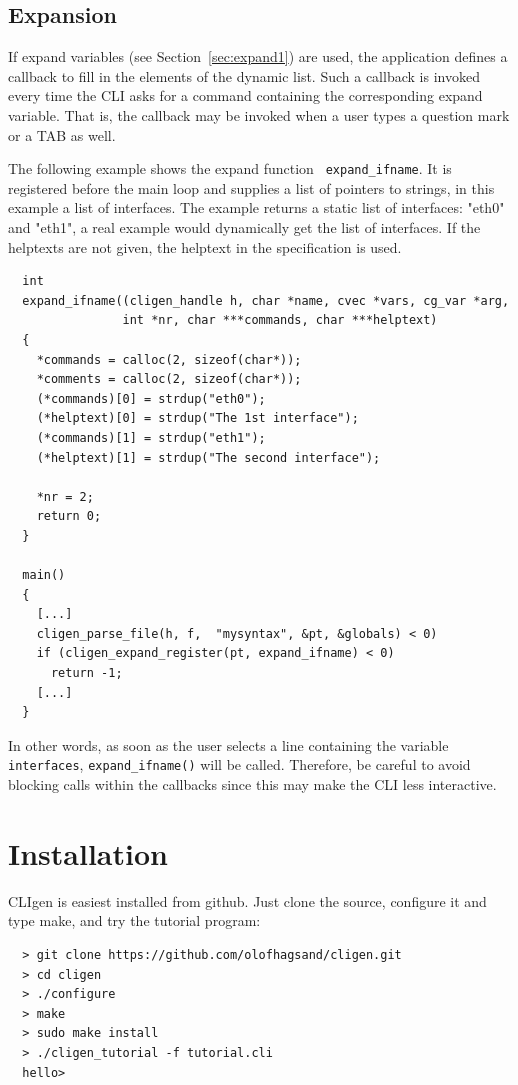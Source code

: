 \documentclass[a4paper, 10pt] {article}
\begin{document}
\subsection{Expansion}
\label{sec:expand}

If expand variables (see Section~\ref{sec:expand1}) are used, the
application defines a callback to fill in the elements of the dynamic
list. Such a callback is invoked every time the CLI asks for a command
containing the corresponding expand variable. That is, the callback
may be invoked when a user types a question mark or a TAB as well.

The following example shows the expand function {\tt
  expand\_ifname}. It is registered before the main loop and supplies
a list of pointers to strings, in this example a list of
interfaces. The example returns a static list of interfaces: "eth0"
and "eth1", a real example would dynamically get the list of
interfaces. If the helptexts are not given, the helptext in the specification is used.


\begin{verbatim}
  int 
  expand_ifname((cligen_handle h, char *name, cvec *vars, cg_var *arg, 
                int *nr, char ***commands, char ***helptext)
  {
    *commands = calloc(2, sizeof(char*)); 
    *comments = calloc(2, sizeof(char*)); 
    (*commands)[0] = strdup("eth0");
    (*helptext)[0] = strdup("The 1st interface");
    (*commands)[1] = strdup("eth1");
    (*helptext)[1] = strdup("The second interface");

    *nr = 2;
    return 0;
  }

  main()
  {   
    [...]
    cligen_parse_file(h, f,  "mysyntax", &pt, &globals) < 0)
    if (cligen_expand_register(pt, expand_ifname) < 0)
      return -1;
    [...]
  }
\end{verbatim}

In other words, as soon as the user selects a line containing the
variable {\tt interfaces}, {\tt expand\_ifname()} will be
called. Therefore, be careful to avoid blocking calls within the
callbacks since this may make the CLI less interactive.

\section{Installation}

CLIgen is easiest installed from github. Just clone the source,
configure it and type make, and try the tutorial program:

\begin{verbatim}
  > git clone https://github.com/olofhagsand/cligen.git
  > cd cligen
  > ./configure
  > make
  > sudo make install
  > ./cligen_tutorial -f tutorial.cli
  hello>
\end{verbatim}
\end{document}
